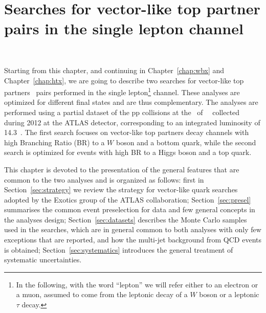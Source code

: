 \clearpage{\pagestyle{empty}\cleardoublepage}

\chapter{Searches for vector-like top partner pairs in the single lepton channel}~\label{chap:vlq}

Starting from this chapter, and continuing in Chapter~\ref{chap:wbx} 
and Chapter~\ref{chap:htx}, we are going to describe two 
searches for vector-like top partners \TTbar\ pairs performed in the single 
lepton\footnote{In the following, with the word ``lepton'' we will 
refer either to an electron or a muon, assumed to come from the leptonic
decay of a $W$ boson or a leptonic $\tau$ decay.}
 channel. These analyses
are optimized for different final states and are thus complementary.
The analyses are performed using a partial dataset of the pp collisions at the \cme\ 
of ~\tev\ collected during 2012 at the ATLAS detector, corresponding to an integrated luminosity of  14.3~\ifb.
The first search focuses on  vector-like top partners decay channels with high 
Branching Ratio (BR) to 
a $W$ boson and a bottom quark, while the second search is optimized for events with 
high BR to a Higgs boson and a top quark.

This chapter is devoted to the presentation of the general features that are common to 
the two analyses and is organized as follows: first in Section~\ref{sec:strategy}
we review the strategy for vector-like quark searches adopted 
by the Exotics group of the ATLAS collaboration; Section~\ref{sec:presel}
summarises the common event preselection for data and few general concepts in the
analyses design; Section~\ref{sec:datasets}
describes the Monte Carlo samples used in the searches, which
are in general common to both analyses with only few exceptions that are reported,
and how the multi-jet background from QCD events is
obtained; Section~\ref{sec:systematics} introduces the general treatment of systematic uncertainties.

